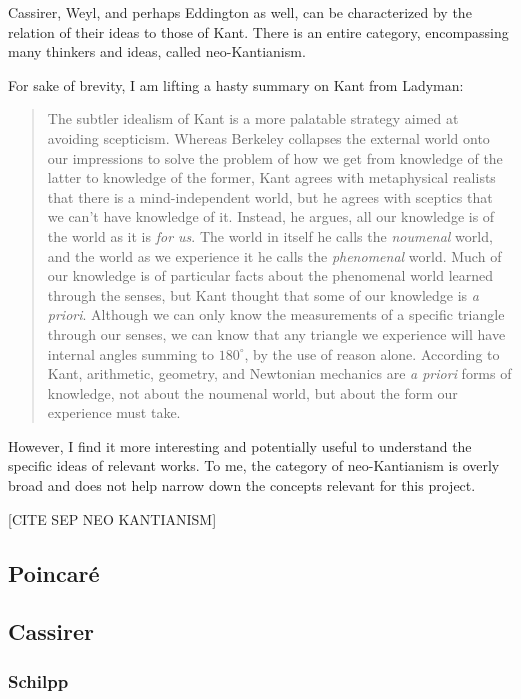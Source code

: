 Cassirer, Weyl, and perhaps Eddington as well, can be characterized by the relation of their ideas to those of Kant.  There is an entire category, encompassing many thinkers and ideas, called neo-Kantianism.  

For sake of brevity, I am lifting a hasty summary on Kant from Ladyman:


\begin{quote}
    The subtler idealism of Kant is a more palatable strategy aimed at avoiding scepticism.  Whereas Berkeley collapses the external world onto our impressions to solve the problem of how we get from knowledge of the latter to knowledge of the former, Kant agrees with metaphysical realists that there is a mind-independent world, but he agrees with sceptics that we can't have knowledge of it.  Instead, he argues, all our knowledge is of the world as it is \emph{for us}.  The world in itself he calls the \emph{noumenal} world, and the world as we experience it he calls the \emph{phenomenal} world.  Much of our knowledge is of particular facts about the phenomenal world learned through the senses, but Kant thought that some of our knowledge is \emph{a priori}.  Although we can only know the measurements of a specific triangle through our senses, we can know that any triangle we experience will have internal angles summing to $180^\circ$, by the use of reason alone.  According to Kant, arithmetic, geometry, and Newtonian mechanics are \emph{a priori} forms of knowledge, not about the noumenal world, but about the form our experience must take.  \citep[p. 146]{Ladyman2002}
\end{quote}

However, I find it more interesting and potentially useful to understand the specific ideas of relevant works.  To me, the category of neo-Kantianism is overly broad and does not help narrow down the concepts relevant for this project.

[CITE SEP NEO KANTIANISM]

\subsection{Poincar\'e}




\subsection{Cassirer}

\subsubsection{Schilpp}

